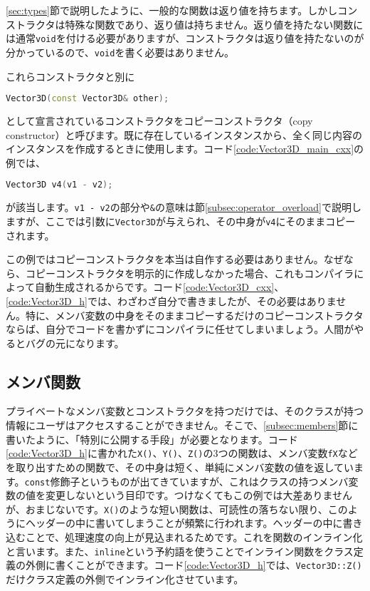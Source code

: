 \ref{sec:types}節で説明したように、一般的な関数は返り値を持ちます。しかしコンストラクタは特殊な関数であり、返り値は持ちません。返り値を持たない関数には通常\texttt{void}を付ける必要がありますが、コンストラクタは返り値を持たないのが分かっているので、\texttt{void}を書く必要はありません。

これらコンストラクタと別に
\begin{lstlisting}[language=c++]
  Vector3D(const Vector3D& other);
\end{lstlisting}
として宣言されているコンストラクタをコピーコンストラクタ（copy constructor）と呼びます。既に存在しているインスタンスから、全く同じ内容のインスタンスを作成するときに使用します。コード\ref{code:Vector3D_main_cxx}の例では、
\begin{lstlisting}[language=c++]
  Vector3D v4(v1 - v2);
\end{lstlisting}
が該当します。\texttt{v1 - v2}の部分や\texttt{\&}の意味は節\ref{subsec:operator_overload}で説明しますが、ここでは引数に\texttt{Vector3D}が与えられ、その中身が\texttt{v4}にそのままコピーされます。

この例ではコピーコンストラクタを本当は自作する必要はありません。なぜなら、コピーコンストラクタを明示的に作成しなかった場合、これもコンパイラによって自動生成されるからです。コード\ref{code:Vector3D_cxx}、\ref{code:Vector3D_h}では、わざわざ自分で書きましたが、その必要はありません。特に、メンバ変数の中身をそのままコピーするだけのコピーコンストラクタならば、自分でコードを書かずにコンパイラに任せてしまいましょう。人間がやるとバグの元になります。

\subsection{メンバ関数}

プライベートなメンバ変数とコンストラクタを持つだけでは、そのクラスが持つ情報にユーザはアクセスすることができません。そこで、\ref{subsec:members}節に書いたように、「特別に公開する手段」が必要となります。コード\ref{code:Vector3D_h}に書かれた\texttt{X()}、\texttt{Y()}、\texttt{Z()}の3つの関数は、メンバ変数\texttt{fX}などを取り出すための関数で、その中身は短く、単純にメンバ変数の値を返しています。\texttt{const}修飾子というものが出てきていますが、これはクラスの持つメンバ変数の値を変更しないという目印です。つけなくてもこの例では大差ありませんが、おまじないです。\texttt{X()}のような短い関数は、可読性の落ちない限り、このようにヘッダーの中に書いてしまうことが頻繁に行われます。ヘッダーの中に書き込むことで、処理速度の向上が見込まれるためです。これを関数のインライン化と言います。また、\texttt{inline}という予約語を使うことでインライン関数をクラス定義の外側に書くことができます。コード\ref{code:Vector3D_h}では、\texttt{Vector3D::Z()}だけクラス定義の外側でインライン化させています。

